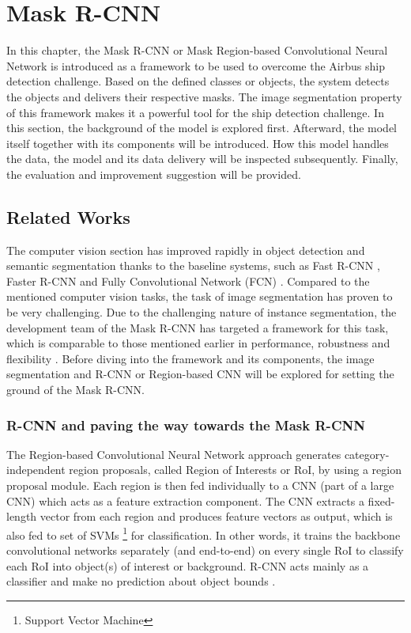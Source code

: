\chapter{Mask R-CNN}
\label{chap:maskrcnn}

In this chapter, the Mask R-CNN or Mask Region-based Convolutional Neural Network is introduced as a framework to be used to overcome the Airbus ship detection challenge.  Based on the defined classes or objects, the system detects the objects and delivers their respective masks. The image segmentation property of this framework makes it a powerful tool for the ship detection challenge. In this section, the background of the model is explored first. Afterward, the model itself together with its components will be introduced. How this model handles the data, the model and its data delivery will be inspected subsequently.  Finally, the evaluation and improvement suggestion will be provided.

\section{Related Works}
\label{sec:relatedworks}

The computer vision section has improved rapidly in object detection and semantic segmentation thanks to the baseline systems, such as Fast R-CNN \cite{Girshick15}, Faster R-CNN \cite{RenHG015} and Fully Convolutional Network (FCN) \cite{LongSD14}. Compared to the mentioned computer vision tasks, the task of image segmentation has proven to be very challenging. Due to the challenging nature of instance segmentation, the development team of the Mask R-CNN has targeted a framework for this task, which is comparable to those mentioned earlier in performance, robustness and flexibility \cite{HeGDG17}. Before diving into the framework and its components, the image segmentation and R-CNN or Region-based CNN will be explored for setting the ground of the Mask R-CNN.

\subsection{R-CNN and paving the way towards the Mask R-CNN}
\label{subsec:imagesegmentation}

The Region-based Convolutional Neural Network approach generates category-independent region proposals, called Region of Interests or RoI, by using a region proposal module. Each region is then fed individually to a CNN (part of a large CNN) which acts as a feature extraction component. The CNN extracts a fixed-length vector from each region and produces feature vectors as output, which is also fed to set of SVMs \footnote{Support Vector Machine} for classification. In other words, it trains the backbone convolutional networks separately (and end-to-end) on every single RoI to classify each RoI into object(s) of interest or background. R-CNN acts mainly as a classifier and make no prediction about object bounds \cite{GirshickDDM13}.

